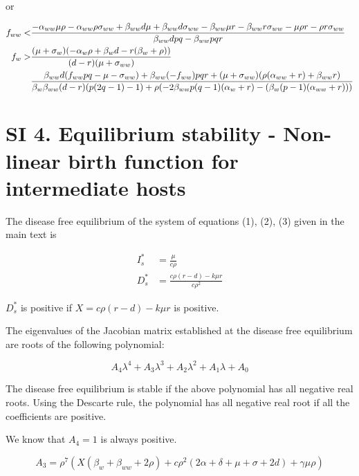 \documentclass[11pt]{article}
\begin{document}
or

\begin{align}
	f_{ww} < & \frac{-\alpha_{ww} \mu  \rho -\alpha_{ww} \rho  \sigma_{ww} + \beta_{ww} d \mu +\beta_{ww} d \sigma_{ww}-\beta_{ww} \mu  r-\beta_{ww} r \sigma_{ww}-\mu  \rho  r-\rho  r \sigma_{ww}}{\beta_{ww} d p q-\beta_{ww} p q r} \notag \\
	f_w > & \frac{(\mu +\sigma_w) (-\alpha_w \rho + \beta_w d-r (\beta_w+\rho ))}{(d-r) (\mu + \sigma_{ww})} \notag \\
	& \frac{\beta_{ww} d (f_{ww} p q-\mu -\sigma_{ww})+\beta_{ww} (-f_{ww}) p q r+(\mu +\sigma_{ww}) (\rho  (\alpha_{ww}+r)+\beta_{ww} r)}{\beta_w \beta_{ww} (d-r) (p (2 q-1)-1)+\rho  (-2 \beta_{ww} p (q-1) (\alpha_w+r)-(\beta_w (p-1) (\alpha_{ww}+r)))} 
\end{align}


\section*{SI 4. Equilibrium stability - Non-linear birth function for intermediate hosts }
The disease free equilibrium of the system of equations (1), (2), (3) given in the main text is

\begin{align}
	I_s^* & = \frac{\mu}{c \rho} \\
	D_s^* & = \frac{c \rho  (r-d)-k \mu  r}{c \rho^2}
\end{align}

$D_s^*$ is positive if $X = c \rho  (r-d)-k \mu  r$ is positive.

The eigenvalues of the Jacobian matrix established at the disease free equilibrium are roots of the following polynomial:

\begin{equation}
	A_4 \lambda^4 + A_3 \lambda^3 + A_2 \lambda^2 + A_1 \lambda + A_0
\end{equation}

The disease free equilibrium is stable if the above polynomial has all negative real roots. Using the Descarte rule, the polynomial has all negative real root if all the coefficients are positive.

We know that $A_4 = 1$ is always positive. 

\begin{equation}
	A_3 = \rho ^7 \left(X (\beta_w + \beta_{ww}+2 \rho ) + c \rho^2  (2 \alpha +\delta +\mu +\sigma + 2 d  )+\gamma  \mu  \rho \right)
\end{equation}
\end{document}
